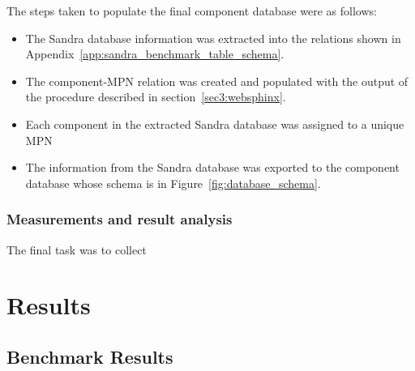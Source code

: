         The steps taken to populate the final component database were as follows:
        \begin{itemize}
            \item The Sandra database information was extracted into the relations shown in Appendix~\ref{app:sandra_benchmark_table_schema}.
            \item The component-MPN relation was created and populated with the output of the procedure described in section~\ref{sec3:websphinx}.
            \item Each component in the extracted Sandra database was assigned to a unique MPN
            \item The information from the Sandra database was exported to the component database whose schema is in Figure~\ref{fig:database_schema}.
        \end{itemize}
    
    \subsubsection*{Measurements and result analysis}
        The final task was to collect 
    
\section{Results} \label{sec4:results}
\subsection{Benchmark Results} \label{sec4:benchmark_results}

